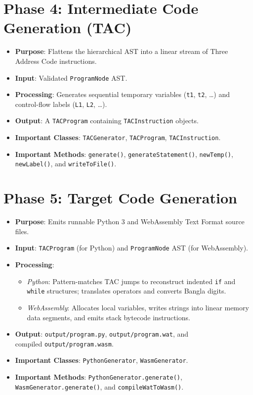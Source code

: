 \documentclass[12pt, a4paper]{report}
\begin{document}
\section{Phase 4: Intermediate Code Generation (TAC)}
\begin{itemize}
    \item \textbf{Purpose}: Flattens the hierarchical AST into a linear stream of Three Address Code instructions.
    \item \textbf{Input}: Validated \texttt{ProgramNode} AST.
    \item \textbf{Processing}: Generates sequential temporary variables (\texttt{t1}, \texttt{t2}, \dots) and control-flow labels (\texttt{L1}, \texttt{L2}, \dots).
    \item \textbf{Output}: A \texttt{TACProgram} containing \texttt{TACInstruction} objects.
    \item \textbf{Important Classes}: \texttt{TACGenerator}, \texttt{TACProgram}, \texttt{TACInstruction}.
    \item \textbf{Important Methods}: \texttt{generate()}, \texttt{generateStatement()}, \texttt{newTemp()}, \texttt{newLabel()}, and \texttt{writeToFile()}.
\end{itemize}

\section{Phase 5: Target Code Generation}
\begin{itemize}
    \item \textbf{Purpose}: Emits runnable Python 3 and WebAssembly Text Format source files.
    \item \textbf{Input}: \texttt{TACProgram} (for Python) and \texttt{ProgramNode} AST (for WebAssembly).
    \item \textbf{Processing}: 
    \begin{itemize}
        \item \textit{Python}: Pattern-matches TAC jumps to reconstruct indented \texttt{if} and \texttt{while} structures; translates operators and converts Bangla digits.
        \item \textit{WebAssembly}: Allocates local variables, writes strings into linear memory data segments, and emits stack bytecode instructions.
    \end{itemize}
    \item \textbf{Output}: \texttt{output/program.py}, \texttt{output/program.wat}, and\\ compiled \texttt{output/program.wasm}.
    \item \textbf{Important Classes}: \texttt{PythonGenerator}, \texttt{WasmGenerator}.
    \item \textbf{Important Methods}: \texttt{PythonGenerator.generate()}, \texttt{WasmGenerator.generate()}, and \texttt{compileWatToWasm()}.
\end{itemize}
\end{document}
